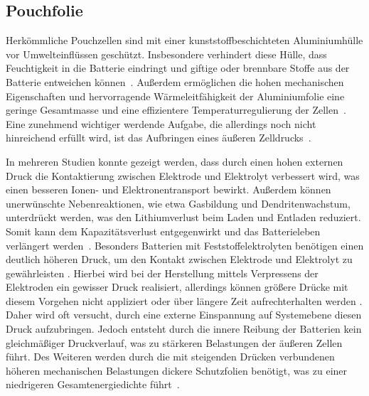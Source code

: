 \subsection{Pouchfolie}
Herkömmliche Pouchzellen sind mit einer kunststoffbeschichteten Aluminiumhülle vor Umwelteinflüssen geschützt. Insbesondere verhindert diese Hülle, dass Feuchtigkeit in die Batterie eindringt und giftige oder brennbare Stoffe aus der Batterie entweichen können~\cite{Beard2019}. Außerdem ermöglichen die hohen mechanischen Eigenschaften und hervorragende Wärmeleitfähigkeit der Aluminiumfolie eine geringe Gesamtmasse und eine effizientere Temperaturregulierung der Zellen~\cite{Boaretto2021}. Eine zunehmend wichtiger werdende Aufgabe, die allerdings noch nicht hinreichend erfüllt wird, ist das Aufbringen eines äußeren Zelldrucks~\cite{Sakamoto2019}.

In mehreren Studien konnte gezeigt werden, dass durch einen hohen externen Druck die Kontaktierung zwischen Elektrode und Elektrolyt verbessert wird, was einen besseren Ionen- und Elektronentransport bewirkt. Außerdem können unerwünschte Nebenreaktionen, wie etwa Gasbildung und Dendritenwachstum,  unterdrückt werden, was den Lithiumverlust beim Laden und Entladen reduziert. Somit kann dem Kapazitätsverlust entgegenwirkt und das Batterieleben verlängert werden~\cite{Mussa2018,Mueller2019,Sakamoto2019}. Besonders Batterien mit Feststoffelektrolyten benötigen einen deutlich höheren Druck, um den Kontakt zwischen Elektrode und Elektrolyt zu gewährleisten \cite{Boaretto2021}. Hierbei wird bei der Herstellung mittels Verpressens der Elektroden ein gewisser Druck realisiert, allerdings können größere Drücke mit diesem Vorgehen nicht appliziert oder über längere Zeit aufrechterhalten werden \cite{Garayt2023}. Daher wird oft versucht, durch eine externe Einspannung auf Systemebene diesen Druck aufzubringen. Jedoch entsteht durch die innere Reibung der Batterien kein gleichmäßiger Druckverlauf, was zu stärkeren Belastungen der äußeren Zellen führt. Des Weiteren werden durch die mit steigenden Drücken verbundenen höheren mechanischen Belastungen  dickere Schutzfolien benötigt, was zu einer niedrigeren Gesamtenergiedichte führt~\cite{Ye2024,Asp2021}.


